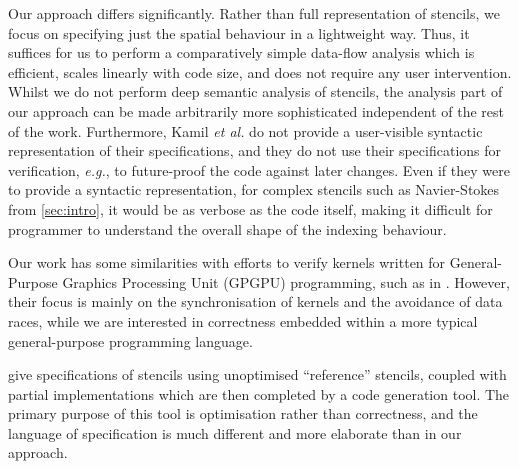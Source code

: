 \documentclass[10pt,preprint]{sigplanconf}
\theoremstyle{definition}
\newcommand{\eg}{\emph{e.g.}}
\begin{document}
Our approach differs significantly. Rather than 
full representation of stencils, we focus on specifying
just the spatial behaviour in a lightweight way.
Thus, it suffices for us to perform a comparatively
simple data-flow analysis which is efficient, scales linearly with
code size, and does not require any user intervention.
Whilst we do not perform deep semantic analysis of stencils,
 the analysis part of our
approach can be made arbitrarily more sophisticated independent of the rest of
the work.
%
Furthermore, Kamil \emph{et al.} do not provide a user-visible
syntactic representation of their specifications, and they do
not use their specifications for verification, \eg{}, to future-proof
the code against later changes. Even if they were to provide a
syntactic representation, for complex stencils such as Navier-Stokes
from \cref{sec:intro}, it would be as verbose as the code itself,
making it difficult for programmer to understand the overall shape of
the indexing behaviour.

Our work has some similarities with efforts to verify kernels
written for General-Purpose Graphics Processing Unit (GPGPU)
programming, such as in \citet{Blom:2014:SoCP}. %
However, their focus is
mainly on the synchronisation of kernels and the avoidance of
data races, while we are interested in correctness 
embedded within a more typical general-purpose programming
language. %

\citet{Solar-Lezama:2007:PLDI} give specifications of stencils using
unoptimised ``reference'' stencils, coupled with partial
implementations which are then completed by a code
generation tool. %
The primary purpose of this tool is optimisation rather than
correctness, and the language of specification is much different and
more elaborate than in our approach.
\end{document}
